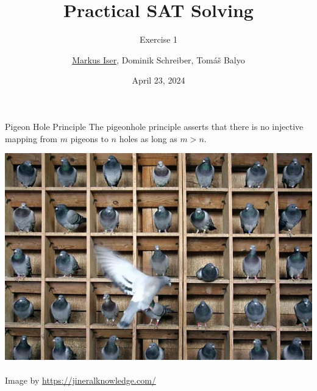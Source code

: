 \documentclass[t]{sdqbeamer}
\title[SAT Solving]{Practical SAT Solving}
\subtitle{Exercise 1}
\author{\underline{Markus Iser}, Dominik Schreiber, Tom\'a\v{s} Balyo}
\date{April 23, 2024}
\begin{document}
\begin{frame}
	\thispagestyle{empty}
	\titlepage
\end{frame}

\begin{frame}{Pigeon Hole Principle}
	The pigeonhole principle asserts that there is no injective mapping from $m$ pigeons to $n$ holes as long as $m > n$.
	\begin{center}
		\includegraphics[height=0.6\textheight]{figures/e01/phole.png}~\\
		Image by \url{https://jineralknowledge.com/}
	\end{center}
\end{frame}
\end{document}
